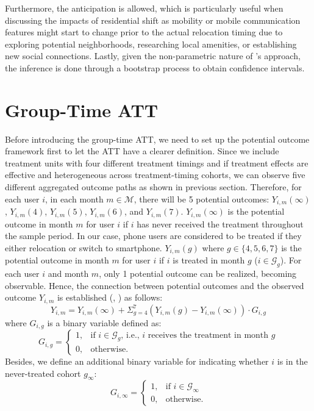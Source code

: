 Furthermore, the anticipation is allowed, which is particularly useful when discussing the impacts of residential shift as mobility or mobile communication features might start to change prior to the actual relocation timing due to exploring potential neighborhoods, researching local amenities, or establishing new social connections. Lastly, given the non-parametric nature of \cite{callaway2021difference}'s approach, the inference is done through a bootstrap process to obtain confidence intervals.

\section{Group-Time ATT}
Before introducing the group-time ATT, we need to set up the potential outcome framework first to let the ATT have a clearer definition.
Since we include treatment units with four different treatment timings and if treatment effects are effective and heterogeneous across treatment-timing cohorts, we can observe five different aggregated outcome paths as shown in previous section. Therefore, for each user $i$, in each month $m \in \mathcal{M}$, there will be 5 potential outcomes: $Y_{i, m}(\infty)$, $Y_{i, m}(4)$, $Y_{i, m}(5)$, $Y_{i, m}(6)$, and $Y_{i, m}(7)$. $Y_{i, m}(\infty)$ is the potential outcome in month $m$ for user $i$ if $i$ has never received the treatment throughout the sample period. In our case, phone users are considered to be treated if they either relocation or switch to smartphone. $Y_{i, m}(g)$ where $g \in \{4,5,6,7\}$ is the potential outcome in month $m$ for user $i$ if $i$ is treated in month $g$ ($i \in \mathcal{G}_g$). For each user $i$ and month $m$, only 1 potential outcome can be realized, becoming observable. Hence, the connection between potential outcomes and the observed outcome $Y_{i, m}$ is established (\cite{callaway2021difference}, \cite{sun2021estimating}) as follows:
\begin{equation}\label{eq:observed_outcome}
Y_{i, m}
= Y_{i, m}(\infty)
    + \Sigma_{g=4}^7 ( Y_{i, m}(g) - Y_{i, m}(\infty) ) \cdot G_{i, g}
\end{equation}
where $G_{i, g}$ is a binary variable defined as:
$$
G_{i, g} =
\begin{cases}
    1,
    & \text{if } i \in \mathcal{G}_g \text{, i.e., $i$ receives the treatment in month $g$} \\
    0,
    & \text{otherwise}.
\end{cases}
$$
Besides, we define an additional binary variable for indicating whether $i$ is in the never-treated cohort $g_\infty$:
$$
G_{i, \infty} =
\begin{cases}
    1,
    & \text{if } i \in \mathcal{G}_{\infty} \\
    0,
    & \text{otherwise}.
\end{cases}
$$

